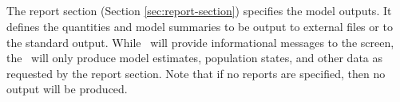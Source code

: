 \subsection{}

The report section (Section \ref{sec:report-section}) specifies the model outputs. It defines the quantities and model summaries to be output to external files or to the standard output. While \SPM\ will provide informational messages to the screen, the \SPM\ will only produce model estimates, population states, and other data as requested by the report section. Note that if no reports are specified, then no output will be produced.
